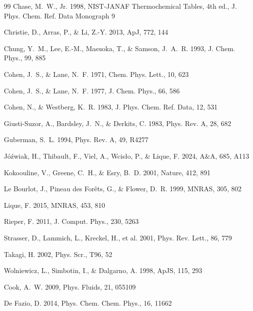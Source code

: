 \begin{thebibliography}{99}
Chase, M.~W., Jr. 1998, NIST-JANAF Thermochemical Tables, 4th ed., J. Phys. Chem. Ref. Data Monograph 9

Christie, D., Arras, P., \& Li, Z.-Y. 2013, ApJ, 772, 144

Chung, Y.~M., Lee, E.-M., Masuoka, T., \& Samson, J.~A.~R. 1993,
J. Chem. Phys., 99, 885

Cohen, J.~S., \& Lane, N.~F. 1971, Chem. Phys. Lett., 10, 623

Cohen, J.~S., \& Lane, N.~F. 1977, J. Chem. Phys., 66, 586

Cohen, N., \& Westberg, K.~R. 1983, J. Phys. Chem. Ref. Data, 12, 531

Giusti-Suzor, A., Bardsley, J.~N., \& Derkits, C. 1983, Phys. Rev. A, 28, 682

Guberman, S.~L. 1994, Phys. Rev. A, 49, R4277

J\'o\'zwiak, H., Thibault, F., Viel, A., Wcis{\l}o, P., \& Lique, F. 2024,
A\&A, 685, A113

Kokoouline, V., Greene, C.~H., \& Esry, B.~D. 2001, Nature, 412, 891

Le Bourlot, J., Pineau des For\^ets, G., \& Flower, D.~R. 1999, MNRAS, 305, 802

Lique, F. 2015, MNRAS, 453, 810

Rieper, F. 2011, J. Comput. Phys., 230, 5263

Strasser, D., Lammich, L., Kreckel, H., et al. 2001, Phys. Rev. Lett., 86, 779

Takagi, H. 2002, Phys. Scr., T96, 52

Wolniewicz, L., Simbotin, I., \& Dalgarno, A. 1998, ApJS, 115, 293

Cook, A.~W. 2009, Phys. Fluids, 21, 055109

De Fazio, D. 2014, Phys. Chem. Chem. Phys., 16, 11662


\end{thebibliography}
